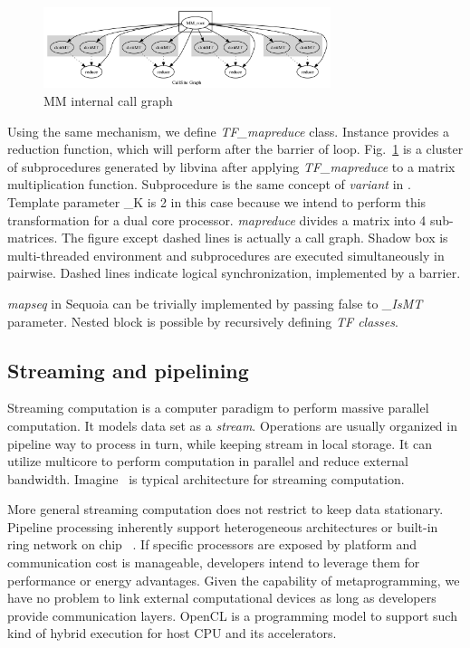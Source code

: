\documentclass[10pt, conference, compsocconf]{IEEEtran}
\begin{document}
\begin{figure}
\centering
\includegraphics[width=3.3in]{test_matrix}
\caption{MM internal call graph}\label{fig:mm}
\end{figure}

Using the same mechanism, we define \emph{TF\_mapreduce}
class. Instance provides a reduction function, which will perform
after the barrier of loop. Fig.~\ref{fig:mm} is a cluster of subprocedures generated by libvina
after applying \emph{TF\_mapreduce} to a matrix multiplication
function. Subprocedure is the same concept of \emph{variant } in
\cite{sequoia, merge}. Template parameter \_K is 2 in this case because we intend
to perform this transformation for a dual core processor. \emph{mapreduce}
divides a matrix into 4 sub-matrices. The figure except dashed lines
is actually a call graph. Shadow box is multi-threaded environment and
subprocedures are executed simultaneously in pairwise. Dashed lines
indicate logical synchronization, implemented by a barrier.

\emph{mapseq} in Sequoia can be trivially implemented by
passing false to \emph{\_IsMT} parameter. Nested block is possible by
recursively defining \emph{TF classes}.

\subsection{Streaming and pipelining}
Streaming computation is a computer paradigm to perform massive parallel computation. It models data set as a \emph{stream}. Operations are usually organized in pipeline way to process in turn, while keeping stream in local storage. It can utilize multicore to perform computation in parallel and reduce external bandwidth.  Imagine~\cite{imagine} is typical architecture for
streaming computation.


More general streaming computation does not restrict to keep data
stationary. Pipeline processing inherently support heterogeneous
architectures or built-in ring network on chip ~\cite{cellbe, larrabee}. If specific processors
are exposed by platform and communication cost is manageable, developers
intend to leverage  them for performance or energy
advantages. Given the capability of metaprogramming, we have no problem to link external
computational devices as long as developers provide communication
layers. OpenCL is a programming model to support such kind of hybrid
execution for host CPU and its accelerators. 
\end{document}
